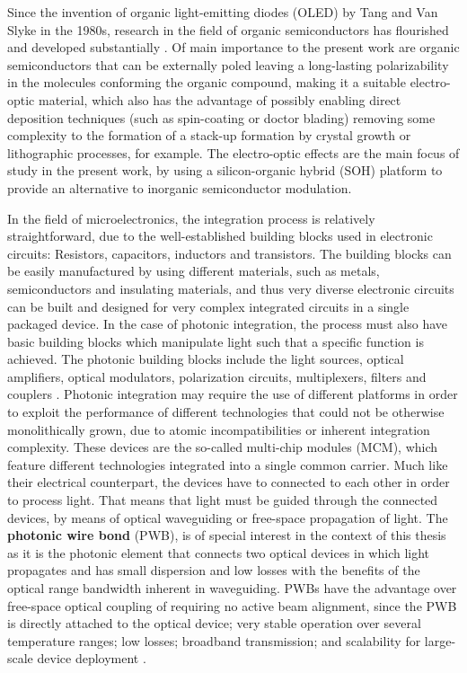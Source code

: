 Since the invention of organic light-emitting diodes (OLED) by Tang and Van Slyke in the 1980s, research in the field of organic semiconductors has flourished and developed substantially \cite{SoOrga09}. Of main importance to the present work are organic semiconductors that can be externally poled leaving a long-lasting polarizability in the molecules conforming the organic compound, making it a suitable electro-optic material, which also has the advantage of possibly enabling direct deposition techniques (such as spin-coating or doctor blading) removing some complexity to the formation of a stack-up formation by crystal growth or lithographic processes, for example. The electro-optic effects are the main focus of study in the present work, by using a silicon-organic hybrid (SOH) platform to provide an alternative to inorganic semiconductor modulation. 
\par\medskip
In the field of microelectronics, the integration process is relatively straightforward, due to the well-established building blocks used in electronic circuits: Resistors, capacitors, inductors and transistors. The building blocks can be easily manufactured by using different materials, such as metals, semiconductors and insulating materials, and thus very diverse electronic circuits can be built and designed for very complex integrated circuits in a single packaged device. In the case of photonic integration, the process must also have basic building blocks which manipulate light such that a specific function is achieved. The photonic building blocks include the light sources, optical amplifiers, optical modulators, polarization circuits, multiplexers, filters and couplers \cite{SmitSiPh14}. Photonic integration may require the use of different platforms in order to exploit the performance of different technologies that could not be otherwise monolithically grown, due to atomic incompatibilities or inherent integration complexity. These devices are the so-called multi-chip modules (MCM), which feature different technologies integrated into a single common carrier. Much like their electrical counterpart, the devices have to connected to each other in order to process light. That means that light must be guided through the connected devices, by means of optical waveguiding or free-space propagation of light. The \textbf{photonic wire bond} (PWB), is of special interest in the context of this thesis as it is the photonic element that connects two optical devices in which light propagates and has small dispersion and low losses with the benefits of the optical range bandwidth inherent in waveguiding. PWBs have the advantage over free-space optical coupling of requiring no active beam alignment, since the PWB is directly attached to the optical device; very stable operation over several temperature ranges; low losses; broadband transmission; and scalability for large-scale device deployment \cite{LindenmannPWB12}. 

